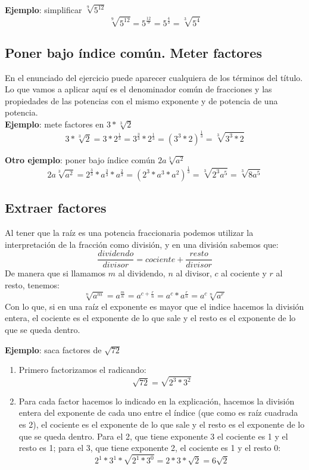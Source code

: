 \documentclass[a4paper,11pt,answers]{exam}
\begin{document}
\textbf{Ejemplo}: simplificar $\sqrt[9]{5^{12}}$\\
\[\sqrt[9]{5^{12}} = 5^{\frac{12}{9}} = 5^{\frac{4}{3}} = \sqrt[3]{5^4}\]
\subsection{Poner bajo índice común. Meter factores}
En el enunciado del ejercicio puede aparecer cualquiera de los términos del título.\\
Lo que vamos a aplicar aquí es el denominador común de fracciones y las propiedades de las potencias con el mismo exponente y de potencia de una potencia.\\

\textbf{Ejemplo}: mete factores en $3 * \sqrt[3]{2}$\\
\[3* \sqrt[3]{2} = 3 * 2^{\frac{1}{3}} = 3^{\frac{3}{3}} * 2^\frac{1}{3} = \left(3^3 * 2 \right)^\frac{1}{3} = \sqrt[3]{3^3*2}\]

\textbf{Otro ejemplo}: poner bajo índice común $2a \sqrt[3]{a^2}$
\[2a \sqrt[3]{a^2} = 2^\frac{3}{3}*a^\frac{3}{3}*a^\frac{2}{3} = \left( 2^3 * a^3 * a^2 \right)^\frac{1}{3} = \sqrt[3]{2^3 a^5} =
\sqrt[3]{8a^5}\]
\subsection{Extraer factores}
Al tener que la raíz es una potencia fraccionaria podemos utilizar la interpretación de la fracción como división, y en una división sabemos que:
\[\frac{dividendo}{divisor} = cociente + \frac{resto}{divisor}\]
De manera que si llamamos $m$ al dividendo, $n$ al divisor, $c$ al cociente y $r$ al resto, tenemos:
\[\sqrt[n]{a^m} = a^\frac{m}{n} = a^{c + \frac{r}{n}} = a^c * a^\frac{r}{n} = a^c \sqrt[n]{a^r}\]
Con lo que, si en una raíz el exponente es mayor que el indice hacemos la división entera, el cociente es el exponente de lo que sale y el resto es el exponente de lo que se queda dentro.

\textbf{Ejemplo}: saca factores de $\sqrt{72}$
\begin{enumerate}
	\item Primero factorizamos el radicando:
	\[\sqrt{72} = \sqrt{2^3 * 3^2}\]
	\item Para cada factor hacemos lo indicado en la explicación, hacemos la división entera del exponente de cada uno entre el índice (que como es raíz cuadrada es 2), el cociente es el exponente de lo que sale y el resto es el exponente de lo que se queda dentro. Para el 2, que tiene exponente 3 el cociente es 1 y el resto es 1; para el 3, que tiene exponente 2, el cociente es 1 y el resto 0:
	\[2^1 * 3^1 * \sqrt{2^1 * 3^0} = 2* 3 * \sqrt{2} = 6 \sqrt{2}\]
\end{enumerate}
\end{document}
